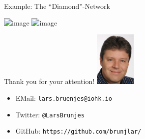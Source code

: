 ﻿\documentclass[aspectratio=169]{beamer}
\begin{document}
\begin{frame}{Example: The ``Diamond''-Network}
    \begin{minipage}{0.7\textwidth}%
        \centering
        \includegraphics<1>[height=0.8\textheight]{images/diamond1.png}
        \includegraphics<2>[height=0.8\textheight]{images/diamond2.png}
    \end{minipage}%
    \begin{minipage}{0.3\textwidth}%
        \centering
    \end{minipage}%
\end{frame}

\begin{frame}{Thank you for your attention!}
    \includegraphics[width=2cm]{images/profile.jpg}
    \begin{itemize}
        \item
            EMail: \texttt{lars.bruenjes@iohk.io}
        \item
            Twitter: \texttt{@LarsBrunjes}
        \item
            GitHub: \texttt{https://github.com/brunjlar/}
    \end{itemize}
\end{frame}
\end{document}
